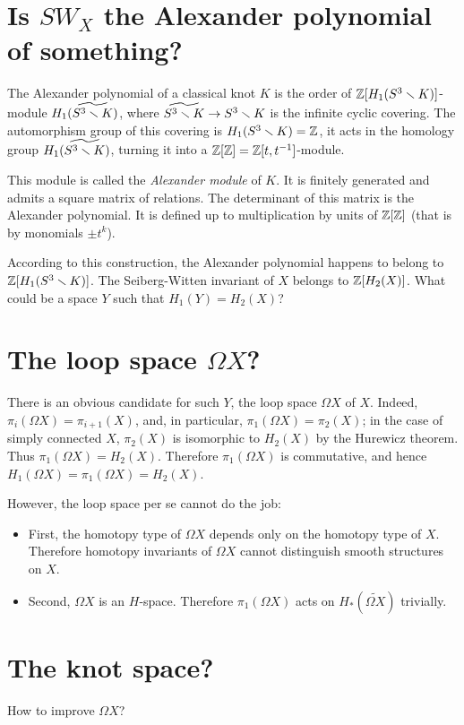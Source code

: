 \documentclass{article}
\begin{document}
\section{Is ${SW}_X$ the Alexander polynomial of
something?}\label{s4} The Alexander polynomial of a classical knot $K$ is
the order of $\mathbb Z[H_1(S^3\smallsetminus K)]$-module $H_1(\widetilde{S^3\smallsetminus
K})$, where $\widetilde{S^3\smallsetminus K}\to S^3\smallsetminus K$ is the infinite
cyclic covering. The automorphism group of this covering is $H_1(S^3\smallsetminus
K)=\mathbb Z$, it acts
in the homology group $H_1(\widetilde{S^3\smallsetminus K})$, turning it into a
$\mathbb Z[\mathbb Z]=\mathbb Z[t,t^{-1}]$-module. 

This module is called the {\em Alexander module\/} of $K$. It is  
finitely generated and admits a square matrix of relations.
The determinant of this matrix is the Alexander polynomial. 
It is defined up to multiplication by units 
of $\mathbb Z[\mathbb Z]$ (that is by monomials $\pm t^k$).    

According to this construction, the Alexander polynomial happens to belong to
$\mathbb Z[H_1(S^3\smallsetminus K)]$. The Seiberg-Witten invariant of $X$ belongs to 
$\mathbb Z[H_2(X)]$. What could be a space $Y$ such that $H_1(Y)=H_2(X)$?

\section{The loop space $\Omega X$?}\label{s5}
There is an obvious candidate for such $Y$, the loop space $\Omega X$ of $X$.
Indeed, $\pi_i(\Omega X)=\pi_{i+1}(X)$, and, in particular, 
$\pi_1(\Omega X)=\pi_2(X)$; in the case of simply connected $X$, 
 $\pi_2(X)$ is isomorphic to $H_2(X)$ by the Hurewicz theorem. 
Thus $\pi_1(\Omega X)=H_2(X)$. Therefore $\pi_1(\Omega X)$ is commutative,
and hence  $H_1(\Omega X)=\pi_1(\Omega X)=H_2(X)$.

However, the loop space per se cannot do the job:\begin{itemize}
\item
First, the homotopy type of $\Omega X$ depends only on the homotopy type of
$X$. Therefore homotopy invariants of $\Omega X$ cannot distinguish 
smooth structures on $X$.
\item
Second, $\Omega X$ is an $H$-space. Therefore $\pi_1(\Omega X)$ acts on
$H_*(\widetilde{\Omega X})$ trivially.
\end{itemize}

\section{ The knot space?}\label{s6}
How to improve $\Omega X$? 
\end{document}
